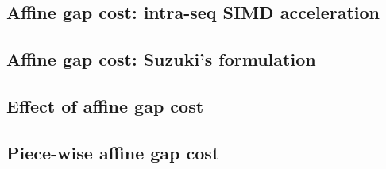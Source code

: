 \documentclass{bioinfo}
\begin{document}
\subsection{Affine gap cost: intra-seq SIMD acceleration}

\subsection{Affine gap cost: Suzuki's formulation}

\subsection{Effect of affine gap cost}

\subsection{Piece-wise affine gap cost}


\end{document}
